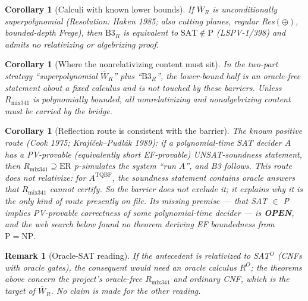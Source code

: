 \documentclass[11pt]{article}
\newtheorem{corollary}[theorem]{Corollary}
\newtheorem{remark}[theorem]{Remark}
\newcommand{\SAT}{\mathrm{SAT}}
\newcommand{\Wb}{\overline W}
\newcommand{\TQBF}{\mathrm{TQBF}}
\newcommand{\Rmix}{R_{\mathrm{mix341}}}
\begin{document}
\begin{corollary}[Calculi with known lower bounds]
If $\Wb_R$ is unconditionally superpolynomial (Resolution: Haken 1985; also cutting planes,
regular Res$(\oplus)$, bounded-depth Frege), then $\mathrm B3_R$ is \emph{equivalent} to
$\SAT\notin\mathrm P$ (LSPV-1/398) and admits no relativizing or algebrizing proof.
\end{corollary}

\begin{corollary}[Where the nonrelativizing content must sit]
In the two-part strategy ``superpolynomial $\Wb_R$'' plus ``$\mathrm B3_R$'', the
lower-bound half is an oracle-free statement about a fixed calculus and is not touched by
these barriers. Unless $\Rmix$ is polynomially bounded, \emph{all} nonrelativizing and
nonalgebrizing content must be carried by the bridge.
\end{corollary}

\begin{corollary}[Reflection route is consistent with the barrier]
The known positive route (Cook 1975; Krajíček--Pudlák 1989): if a polynomial-time SAT
decider $A$ has a PV-provable (equivalently short EF-provable) UNSAT-soundness statement,
then $\Rmix\supseteq\mathrm{ER}$ p-simulates the system ``run $A$'', and B3 follows. This
route does \emph{not} relativize: for $A^{\TQBF}$, the soundness statement contains oracle
answers that $\Rmix$ cannot certify. So the barrier does not exclude it; it explains why
it is the only kind of route presently on file. Its missing premise --- that SAT $\in$ P
implies PV-provable correctness of \emph{some} polynomial-time decider --- is \textbf{OPEN},
and the web search below found no theorem deriving EF boundedness from $\mathrm P=\mathrm{NP}$.
\end{corollary}

\begin{remark}[Oracle-SAT reading]
If the antecedent is relativized to SAT$^O$ (CNFs with oracle gates), the consequent would
need an oracle calculus $R^O$; the theorems above concern the project's oracle-free $\Rmix$
and ordinary CNF, which is the target of $\Wb_R$. No claim is made for the other reading.
\end{remark}
\end{document}
